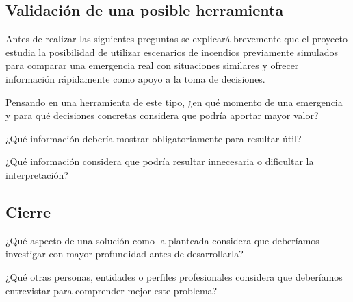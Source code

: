 \subsection{Validación de una posible herramienta}

Antes de realizar las siguientes preguntas se explicará brevemente que el proyecto
estudia la posibilidad de utilizar escenarios de incendios previamente simulados
para comparar una emergencia real con situaciones similares y ofrecer información
rápidamente como apoyo a la toma de decisiones.

\begin{enumerate}
  \pregunta Pensando en una herramienta de este tipo, ¿en qué momento de una emergencia y para qué decisiones concretas considera que podría aportar mayor valor?

  \pregunta ¿Qué información debería mostrar obligatoriamente para resultar útil?

  \pregunta ¿Qué información considera que podría resultar innecesaria o dificultar la interpretación?





\end{enumerate}


\subsection{Cierre}

\begin{enumerate}


  \pregunta ¿Qué aspecto de una solución como la planteada considera que deberíamos investigar con mayor profundidad antes de desarrollarla?

  \pregunta ¿Qué otras personas, entidades o perfiles profesionales considera que deberíamos entrevistar para comprender mejor este problema?
\end{enumerate}




\clearpage
